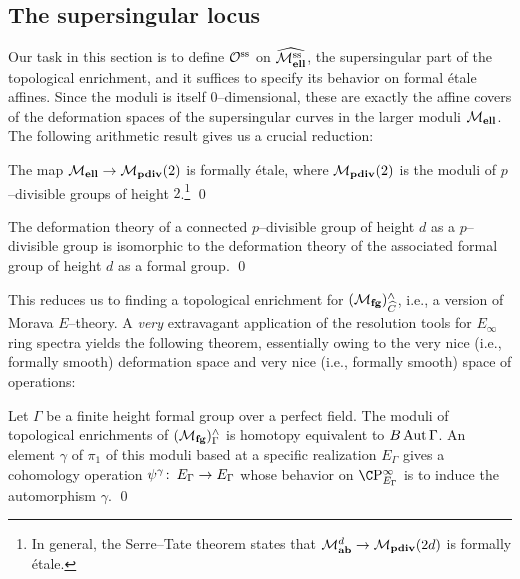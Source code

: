\subsection*{The supersingular locus}

Our task in this section is to define $\mathcal{O}^{\mathrm{ss}}$ on $\widehat{\mathcal{M}_{\mathbf{ell}}^{\mathrm{ss}}}$, the supersingular part of the topological enrichment, and it suffices to specify its behavior on formal \'etale affines.  Since the moduli is itself $0$--dimensional, these are exactly the affine covers of the deformation spaces of the supersingular curves in the larger moduli $\mathcal{M}_{\mathbf{ell}}$.  The following arithmetic result gives us a crucial reduction:

\begin{theorem}
The map $\mathcal{M}_{\mathbf{ell}} \to \mathcal{M}_{\mathbf{pdiv}}(2)$ is formally \'etale, where $\mathcal{M}_{\mathbf{pdiv}}(2)$ is the moduli of $p$--divisible groups of height $2$.\footnote{In general, the Serre--Tate theorem states that $\mathcal{M}_{\mathbf{ab}}^{d} \to \mathcal{M}_{\mathbf{pdiv}}(2d)$ is formally \'etale.} \qed
\end{theorem}
\begin{lemma}
The deformation theory of a connected $p$--divisible group of height $d$ as a $p$--divisible group is isomorphic to the deformation theory of the associated formal group of height $d$ as a formal group. \qed
\end{lemma}

This reduces us to finding a topological enrichment for $(\mathcal{M}_{\mathbf{fg}})^\wedge_{\widehat{C}}$, i.e., a version of Morava $E$--theory.  A \emph{very} extravagant application of the resolution tools for $E_\infty$ ring spectra yields the following theorem, essentially owing to the very nice (i.e., formally smooth) deformation space and very nice (i.e., formally smooth) space of operations:

\begin{theorem}\label{GHMTheoremForEThy}
Let $\Gamma$ be a finite height formal group over a perfect field.  The moduli of topological enrichments of $(\mathcal{M}_{\mathbf{fg}})^\wedge_\Gamma$ is homotopy equivalent to $B\operatorname{Aut} \Gamma$.  An element $\gamma$ of $\pi_1$ of this moduli based at a specific realization $E_\Gamma$ gives a cohomology operation $\psi^\gamma\colon\thinspace E_\Gamma \to E_\Gamma$ whose behavior on $\CP^\infty_{E_\Gamma}$ is to induce the automorphism $\gamma$. \qed
\end{theorem}

